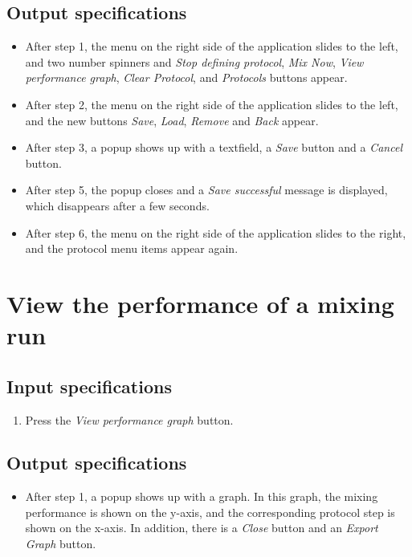 \subsection*{Output specifications}
\begin{itemize}
\item After step 1, the menu on the right side of the application slides to the left, and two number spinners and \emph{Stop defining protocol}, \emph{Mix Now}, \emph{View performance graph}, \emph{Clear Protocol}, and \emph{Protocols} buttons appear.
\item After step 2, the menu on the right side of the application slides to the left, and the new buttons \emph{Save}, \emph{Load}, \emph{Remove} and \emph{Back} appear.
\item After step 3, a popup shows up with a textfield, a \emph{Save} button and a \emph{Cancel} button.
\item After step 5, the popup closes and a \emph{Save successful} message is displayed, which disappears after a few seconds.
\item After step 6, the menu on the right side of the application slides to the right, and the protocol menu items appear again.
\end{itemize}

\section{View the performance of a mixing run}

\subsection*{Input specifications}
\begin{enumerate}
\item Press the \emph{View performance graph} button.
\end{enumerate}

\subsection*{Output specifications}
\begin{itemize}
\item After step 1, a popup shows up with a graph. In this graph, the mixing performance is shown on the y-axis, and the corresponding protocol step is shown on the x-axis. In addition, there is a \emph{Close} button and an \emph{Export Graph} button.
\end{itemize}

